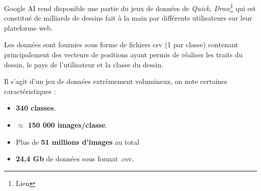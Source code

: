 Google AI rend disponible une partie du jeux de données de \emph{Quick, Draw}\footnote{Lien} qui est constitué de milliards de dessins fait à la main par différents utilisateurs sur leur plateforme web. 


Les données sont fournies sous forme de fichiers csv (1 par classe) contenant principalement des vecteurs de positions ayant permis de réaliser les traits du dessin, le pays de l'utilisateur et la classe du dessin.


Il s'agit d'un jeu de données extrêmement volumineux, on note certaines caractéristiques :

\begin{itemize}
	\item \textbf{340 classes}.
	\item \textbf{$\approx$ 150 000 images/classe}.
	\item Plus de \textbf{51 millions d'images} au total
	\item \textbf{24,4 Gb} de données sous format .csv.
\end{itemize}
